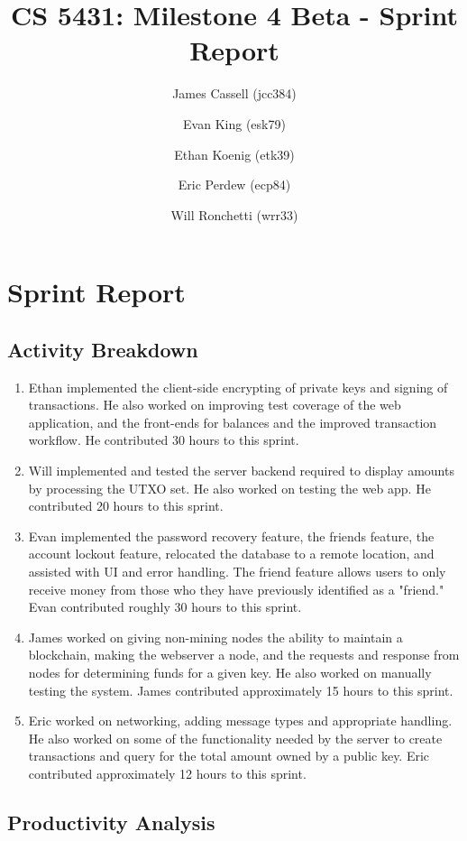 \documentclass[a4paper,12pt]{article}
\title{CS 5431: Milestone 4 Beta - Sprint Report}
\author{
James Cassell (jcc384)
\and
Evan King (esk79)
\and
Ethan Koenig (etk39)
\and
Eric Perdew (ecp84)
\and
Will Ronchetti (wrr33)
}
\begin{document}
\maketitle

\section{Sprint Report}

\subsection{Activity Breakdown}

\begin{enumerate}
\item Ethan implemented the client-side encrypting of private keys and signing of transactions. He also worked on improving test coverage of the web application, and the front-ends for balances and the improved transaction workflow. He contributed 30 hours to this sprint.
\item Will implemented and tested the server backend required to display amounts by processing the UTXO set. He also worked on testing the web app. He contributed 20 hours to this sprint.
\item Evan implemented the password recovery feature, the friends feature, the account lockout feature, relocated the database to a remote location, and assisted with UI and error handling. The friend feature allows users to only receive money from those who they have previously identified as a "friend." Evan contributed roughly 30 hours to this sprint.
\item James worked on giving non-mining nodes the ability to maintain a blockchain, making the webserver a node, and the requests and response from nodes for determining funds for a given key.
  He also worked on manually testing the system.
  James contributed approximately 15 hours to this sprint.
\item Eric worked on networking, adding message types and appropriate handling.
He also worked on some of the functionality needed by the server to create transactions and query for the total amount owned by a public key.
Eric contributed approximately 12 hours to this sprint.
\end{enumerate}

\subsection{Productivity Analysis}
\end{document}
